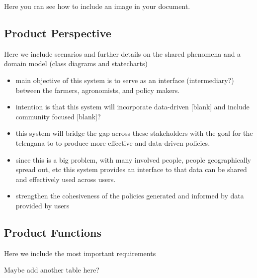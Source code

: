 Here you can see how to include an image in your document.

\subsection{Product Perspective}
Here we include scenarios and further details on the shared phenomena and a domain model (class diagrams and statecharts)


\begin{itemize}
\item
main objective of this system is to serve as an interface (intermediary?) between the farmers, agronomists, and policy makers. 
\item
intention is that this system will incorporate data-driven [blank] and include community focused [blank]? 
\item
this system will bridge the gap across these stakeholders with the goal for the telengana to to produce more effective and data-driven policies.
\item
since this is a big problem, with many involved people, people geographically spread out, etc this system provides an interface to that data can be shared and effectively used across users. 
\item
strengthen the cohesiveness of the policies generated and informed by data provided by users
\end{itemize}


\subsection{Product Functions}
Here we include the most important requirements
\par
Maybe add another table here?



